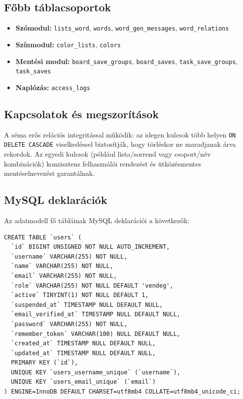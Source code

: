 \documentclass{thesis-ekf}
\begin{document}
\subsection{Főbb táblacsoportok}
\begin{itemize}
  \item \textbf{Szómodul:} \texttt{lists\_word}, \texttt{words}, \texttt{word\_gen\_messages}, \texttt{word\_relations}
  \item \textbf{Színmodul:} \texttt{color\_lists}, \texttt{colors}
  \item \textbf{Mentési modul:} \texttt{board\_save\_groups}, \texttt{board\_saves}, \texttt{task\_save\_groups}, \texttt{task\_saves}
  \item \textbf{Naplózás:} \texttt{access\_logs}
\end{itemize}

\subsection{Kapcsolatok és megszorítások}
A séma erős relációs integritással működik: az idegen kulcsok több helyen \texttt{ON DELETE CASCADE} viselkedéssel biztosítják, hogy törléskor ne maradjanak árva rekordok. Az egyedi kulcsok (például lista/sorrend vagy csoport/név kombinációk) konzisztens felhasználói rendezést és ütközésmentes mentéselnevezést garantálnak.

\subsection{MySQL deklarációk}
Az adatmodell fő tábláinak MySQL deklarációi a következők:

\begin{lstlisting}[style=mysqlstyle]
CREATE TABLE `users` (
  `id` BIGINT UNSIGNED NOT NULL AUTO_INCREMENT,
  `username` VARCHAR(255) NOT NULL,
  `name` VARCHAR(255) NOT NULL,
  `email` VARCHAR(255) NOT NULL,
  `role` VARCHAR(255) NOT NULL DEFAULT 'vendeg',
  `active` TINYINT(1) NOT NULL DEFAULT 1,
  `suspended_at` TIMESTAMP NULL DEFAULT NULL,
  `email_verified_at` TIMESTAMP NULL DEFAULT NULL,
  `password` VARCHAR(255) NOT NULL,
  `remember_token` VARCHAR(100) NULL DEFAULT NULL,
  `created_at` TIMESTAMP NULL DEFAULT NULL,
  `updated_at` TIMESTAMP NULL DEFAULT NULL,
  PRIMARY KEY (`id`),
  UNIQUE KEY `users_username_unique` (`username`),
  UNIQUE KEY `users_email_unique` (`email`)
) ENGINE=InnoDB DEFAULT CHARSET=utf8mb4 COLLATE=utf8mb4_unicode_ci;
\end{lstlisting}
\end{document}
